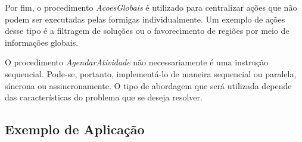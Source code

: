 Por fim, o procedimento \textit{AcoesGlobais} é utilizado para centralizar ações que não podem ser executadas
pelas formigas individualmente. Um exemplo de ações desse tipo é a filtragem de soluções ou o favorecimento de
regiões por meio de informações globais.

O procedimento \textit{AgendarAtividade} não necessariamente é uma instrução sequencial. Pode-se, portanto,
implementá-lo de maneira sequencial ou paralela, síncrona ou assincronamente. O tipo de abordagem que será
utilizada depende das características do problema que se deseja resolver.

\subsection{Exemplo de Aplicação}

